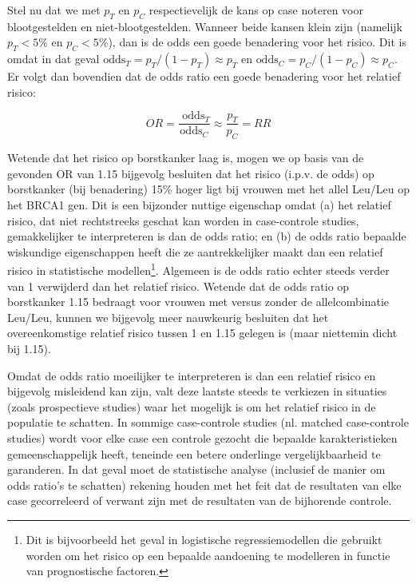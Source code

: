 \documentclass[12pt,dutch,coursenotes]{book}
\let\rmarkdownfootnote\footnote%
\def\footnote{\protect\rmarkdownfootnote}
\theoremstyle{definition}
\theoremstyle{definition}
\theoremstyle{definition}
\theoremstyle{remark}
\begin{document}
Stel nu dat we met \(p_T\) en \(p_C\) respectievelijk de kans op case
noteren voor blootgestelden en niet-blootgestelden. Wanneer beide kansen
klein zijn (namelijk \(p_T<5\%\) en \(p_C<5\%\)), dan is de odds een
goede benadering voor het risico. Dit is omdat in dat geval
\(\mbox{odds}_T=p_T/(1-p_T)\approx p_T\) en
\(\mbox{odds}_C=p_C/(1-p_C)\approx p_C\). Er volgt dan bovendien dat de
odds ratio een goede benadering voor het relatief risico:

\begin{equation*}
OR=\frac{\mbox{ odds}_T}{\mbox{
odds}_C}\approx \frac{p_T}{p_C}=RR
\end{equation*}

Wetende dat het risico op borstkanker laag is, mogen we op basis van de
gevonden OR van 1.15 bijgevolg besluiten dat het risico (i.p.v. de odds)
op borstkanker (bij benadering) 15\% hoger ligt bij vrouwen met het
allel Leu/Leu op het BRCA1 gen. Dit is een bijzonder nuttige eigenschap
omdat (a) het relatief risico, dat niet rechtstreeks geschat kan worden
in case-controle studies, gemakkelijker te interpreteren is dan de odds
ratio; en (b) de odds ratio bepaalde wiskundige eigenschappen heeft die
ze aantrekkelijker maakt dan een relatief risico in statistische
modellen\footnote{Dit is bijvoorbeeld het geval in logistische
  regressiemodellen die gebruikt worden om het risico op een bepaalde
  aandoening te modelleren in functie van prognostische factoren.}.
Algemeen is de odds ratio echter steeds verder van 1 verwijderd dan het
relatief risico. Wetende dat de odds ratio op borstkanker 1.15 bedraagt
voor vrouwen met versus zonder de allelcombinatie Leu/Leu, kunnen we
bijgevolg meer nauwkeurig besluiten dat het overeenkomstige relatief
risico tussen 1 en 1.15 gelegen is (maar niettemin dicht bij 1.15).

Omdat de odds ratio moeilijker te interpreteren is dan een relatief
risico en bijgevolg misleidend kan zijn, valt deze laatste steeds te
verkiezen in situaties (zoals prospectieve studies) waar het mogelijk is
om het relatief risico in de populatie te schatten. In sommige
case-controle studies (nl. matched case-controle studies) wordt voor
elke case een controle gezocht die bepaalde karakteristieken
gemeenschappelijk heeft, teneinde een betere onderlinge
vergelijkbaarheid te garanderen. In dat geval moet de statistische
analyse (inclusief de manier om odds ratio's te schatten) rekening
houden met het feit dat de resultaten van elke case gecorreleerd of
verwant zijn met de resultaten van de bijhorende controle.
\end{document}
